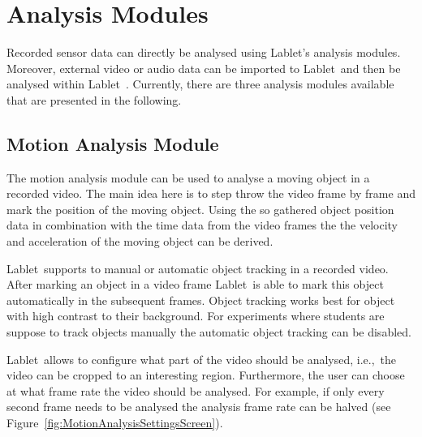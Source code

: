 \documentclass{sigchi}
\newcommand{\ie}{i.e.,\ }
\newcommand{\lablet}{Lablet\ }
\begin{document}
\section{Analysis Modules}\label{sec:AnalysisModules}
Recorded sensor data can directly be analysed using Lablet's analysis modules.
Moreover, external video or audio data can be imported to \lablet and then be analysed within \lablet.
Currently, there are three analysis modules available that are presented in the following.

\subsection{Motion Analysis Module}
The motion analysis module can be used to analyse a moving object in a recorded video.
The main idea here is to step throw the video frame by frame and mark the position of the moving object.
Using the so gathered object position data in combination with the time data from the video frames the the velocity and acceleration of the moving object can be derived.

\lablet supports to manual or automatic object tracking in a recorded video.
After marking an object in a video frame \lablet is able to mark this object automatically in the subsequent frames.
Object tracking works best for object with high contrast to their background.
For experiments where students are suppose to track objects manually the automatic object tracking can be disabled.

\lablet allows to configure what part of the video should be analysed, \ie the video can be cropped to an interesting region.
Furthermore, the user can choose at what frame rate the video should be analysed.
For example, if only every second frame needs to be analysed the analysis frame rate can be halved (see Figure~\ref{fig:MotionAnalysisSettingsScreen}).
\end{document}
